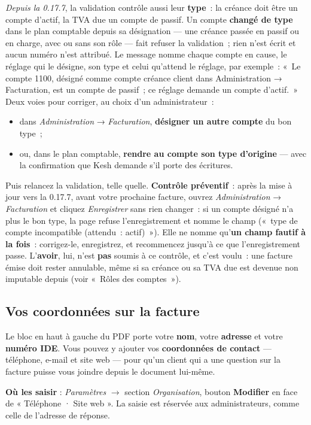 \documentclass[a4paper,11pt,oneside]{article}
\begin{document}
\emph{Depuis la 0.17.7}, la validation contrôle aussi leur \textbf{type}~: la créance doit être un compte d'actif, la TVA due un compte de passif. Un compte \textbf{changé de type} dans le plan comptable depuis sa désignation --- une créance passée en passif ou en charge, avec ou sans son rôle --- fait refuser la validation~; rien n'est écrit et aucun numéro n'est attribué. Le message nomme chaque compte en cause, le réglage qui le désigne, son type et celui qu'attend le réglage, par exemple~: «~Le compte 1100, désigné comme compte créance client dans Administration → Facturation, est un compte de passif~; ce réglage demande un compte d'actif.~» Deux voies pour corriger, au choix d'un administrateur~:
\begin{itemize}
    \item dans \emph{Administration} → \emph{Facturation}, \textbf{désigner un autre compte} du bon type~;
    \item ou, dans le plan comptable, \textbf{rendre au compte son type d'origine} --- avec la confirmation que Kesh demande s'il porte des écritures.
\end{itemize}
Puis relancez la validation, telle quelle. \textbf{Contrôle préventif}~: après la mise à jour vers la 0.17.7, avant votre prochaine facture, ouvrez \emph{Administration} → \emph{Facturation} et cliquez \emph{Enregistrer} sans rien changer~: si un compte désigné n'a plus le bon type, la page refuse l'enregistrement et nomme le champ («~type de compte incompatible (attendu~: actif)~»). Elle ne nomme qu'\textbf{un champ fautif à la fois}~: corrigez-le, enregistrez, et recommencez jusqu'à ce que l'enregistrement passe. L'\textbf{avoir}, lui, n'est \textbf{pas} soumis à ce contrôle, et c'est voulu~: une facture émise doit rester annulable, même si sa créance ou sa TVA due est devenue non imputable depuis (voir «~Rôles des comptes~»).

\subsection{Vos coordonnées sur la facture}\label{sec:coordonnees-emetteur}

Le bloc en haut à gauche du PDF porte votre \textbf{nom}, votre \textbf{adresse} et votre \textbf{numéro IDE}. Vous pouvez y ajouter vos \textbf{coordonnées de contact} --- téléphone, e-mail et site web --- pour qu'un client qui a une question sur la facture puisse vous joindre depuis le document lui-même.

\textbf{Où les saisir} : \emph{Paramètres} $\rightarrow$ section \emph{Organisation}, bouton \textbf{Modifier} en face de « Téléphone · Site web ». La saisie est réservée aux administrateurs, comme celle de l'adresse de réponse.
\end{document}
